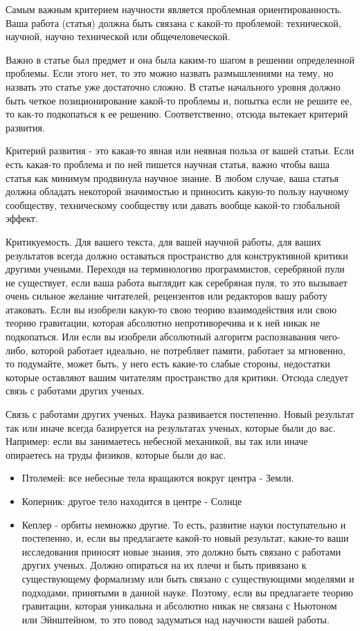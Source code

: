 \documentclass{report}
\begin{document}
Самым важным критерием научности является проблемная ориентированность. Ваша работа (статья) должна быть связана с какой-то проблемой: технической, научной, научно технической или общечеловеческой.

Важно в статье был предмет и она была каким-то шагом в решении определенной проблемы. Если этого нет, то это можно назвать размышлениями на тему, но назвать это статье уже достаточно сложно. В статье начального уровня должно быть четкое позиционирование какой-то проблемы и, попытка если не решите ее, то как-то подкопаться к ее решению. Соответственно, отсюда вытекает критерий развития.

Критерий развития - это какая-то явная или неявная польза от вашей статьи. Если есть какая-то проблема и по ней пишется научная статья, важно чтобы ваша статья как минимум продвинула научное знание. В любом случае, ваша статья должна обладать некоторой значимостью и приносить какую-то пользу научному сообществу, техническому сообществу или давать вообще какой-то глобальной эффект.

Критикуемость. Для вашего текста, для вашей научной работы, для ваших результатов всегда должно оставаться пространство для конструктивной критики другими учеными. Переходя на терминологию программистов, серебряной пули не существует, если ваша работа выглядит как серебряная пуля, то это вызывает очень сильное желание читателей, рецензентов или редакторов вашу работу атаковать. Если вы изобрели какую-то свою теорию взаимодействия или свою теорию гравитации, которая абсолютно непротиворечива и к ней никак не подкопаться. Или если вы изобрели абсолютный алгоритм распознавания чего-либо, которой работает идеально, не потребляет памяти, работает за мгновенно, то подумайте, может быть, у него есть какие-то слабые стороны, недостатки которые оставляют вашим читателям пространство для критики. Отсюда следует связь с работами других ученых.

Связь с работами других ученых. Наука развивается постепенно. Новый результат так или иначе всегда базируется на результатах ученых, которые были до вас. Например: если вы занимаетесь небесной механикой, вы так или иначе опираетесь на труды физиков, которые были до вас.

\begin{itemize}
	\item Птолемей: все небесные тела вращаются вокруг центра - Земли.
	\item Коперник: другое тело находится в центре - Солнце
	\item Кеплер - орбиты немножко другие. То есть, развитие науки поступательно и постепенно, и, если вы предлагаете какой-то новый результат, какие-то ваши исследования приносят новые знания, это должно быть связано с работами других ученых. Должно опираться на их плечи и быть привязано к существующему формализму или быть связано с существующими моделями и подходами, принятыми в данной науке. Поэтому, если вы предлагаете теорию гравитации, которая уникальна и абсолютно никак не связана с Ньютоном или Эйнштейном, то это повод задуматься над научности вашей работы.

\end{itemize}
\end{document}
